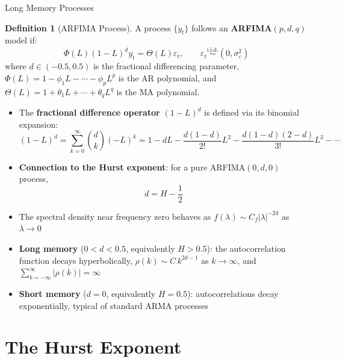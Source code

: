 \documentclass[9pt, aspectratio=169, t]{beamer}
\theoremstyle{definition}
\newtheorem{defn}{Definition}
\begin{document}
\begin{frame}{Long Memory Processes}
    \begin{defn}[ARFIMA Process]
        A process $\{y_t\}$ follows an \textbf{ARFIMA}$(p,d,q)$ model if:
        \[
            \Phi(L)(1-L)^d y_t = \Theta(L)\varepsilon_t, \qquad \varepsilon_t \overset{\text{i.i.d.}}{\sim} (0, \sigma^2_\varepsilon)
        \]
        where $d \in (-0.5, 0.5)$ is the fractional differencing parameter, $\Phi(L) = 1 - \phi_1 L - \cdots - \phi_p L^p$ is the AR polynomial, and $\Theta(L) = 1 + \theta_1 L + \cdots + \theta_q L^q$ is the MA polynomial.
    \end{defn}
    \begin{itemize}
        \item The \textbf{fractional difference operator} $(1-L)^d$ is defined via its binomial expansion:
        \[
            (1-L)^d = \sum_{k=0}^{\infty} \binom{d}{k} (-L)^k = 1 - dL - \frac{d(1-d)}{2!}L^2 - \frac{d(1-d)(2-d)}{3!}L^3 - \cdots
        \]
        \item \textbf{Connection to the Hurst exponent}: for a pure ARFIMA$(0,d,0)$ process,
        \[
            d = H - \frac{1}{2}
        \]
        \item The spectral density near frequency zero behaves as $f(\lambda) \sim C_f |\lambda|^{-2d}$ as $\lambda \to 0$
        \item \textbf{Long memory} ($0 < d < 0.5$, equivalently $H > 0.5$): the autocorrelation function decays hyperbolically, $\rho(k) \sim C \, k^{2d-1}$ as $k \to \infty$, and $\sum_{k=-\infty}^{\infty} |\rho(k)| = \infty$
        \item \textbf{Short memory} ($d = 0$, equivalently $H = 0.5$): autocorrelations decay exponentially, typical of standard ARMA processes
    \end{itemize}
\end{frame}

\section{The Hurst Exponent}
\end{document}
